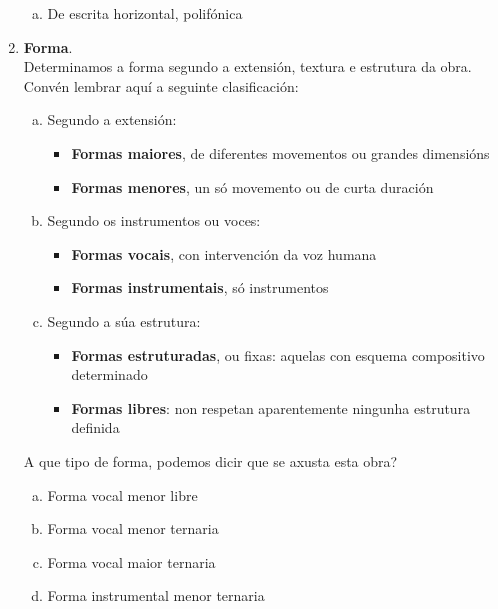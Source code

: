 \begin{multicols}{2}
\begin{enumerate}[1.-]
\begin{enumerate}[a)]
                \item 
                De escrita horizontal, polifónica
            \end{enumerate}
        \item %
        \textbf{Forma}. \\
        Determinamos a forma segundo a extensión, textura e estrutura da obra. \\ 
        Convén lembrar aquí a seguinte clasificación:
            \begin{enumerate}[a)]
                \item
                Segundo a extensión:
                \begin{itemize}
                    \item
                    \textbf{Formas maiores}, de diferentes movementos ou grandes dimensións
                    \item
                    \textbf{Formas menores}, un só movemento ou de curta duración
                \end{itemize}
                \item
                Segundo os instrumentos ou voces:
                 \begin{itemize}
                    \item
                    \textbf{Formas vocais}, con intervención da voz humana
                    \item
                    \textbf{Formas instrumentais}, só instrumentos
                \end{itemize}
                \item 
                Segundo a súa estrutura:
                \begin{itemize}
                    \item 
                    \textbf{Formas estruturadas}, ou fixas: aquelas con esquema compositivo determinado
                    \item
                    \textbf{Formas libres}: non respetan aparentemente ningunha estrutura definida
                \end{itemize}
            \end{enumerate}
        \par %
        A que tipo de forma, podemos dicir que se axusta esta obra? 
        \begin{enumerate}[a)]
            \item 
            Forma vocal menor libre
            \item
            Forma vocal menor ternaria
            \item
            Forma vocal maior ternaria
            \item
            Forma instrumental menor ternaria
        \end{enumerate}
        \end{enumerate}
%
\end{multicols}
%
